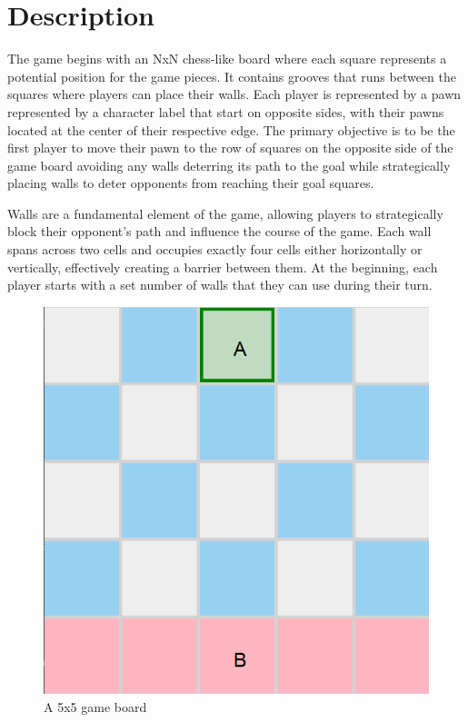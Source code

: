 \chapter{Description}
\label{GameDescription}

The game begins with an NxN chess-like board where each square represents a potential position for the game
pieces. It contains grooves that runs between the squares where players can place their walls. Each player
is represented by a pawn represented by a character label that start on opposite sides, with their pawns
located at the center of their respective edge. The primary objective is to be the first player to move
their pawn to the row of squares on the opposite side of the game board avoiding any walls deterring its
path to the goal while strategically placing walls to deter opponents from reaching their goal squares.
\par
Walls are a fundamental element of the game, allowing players to strategically block their opponent's path
and influence the course of the game. Each wall spans across two cells and occupies exactly four cells either
horizontally or vertically, effectively creating a barrier between them. At the beginning, each player starts
with a set number of walls that they can use during their turn.

\begin{figure}[h]
    \centering
    \includegraphics[scale=0.25]{../img/GameBoard/initial.png}
    \caption{A 5x5 game board}
    \label{fig:InitialGameBoard}
\end{figure}

